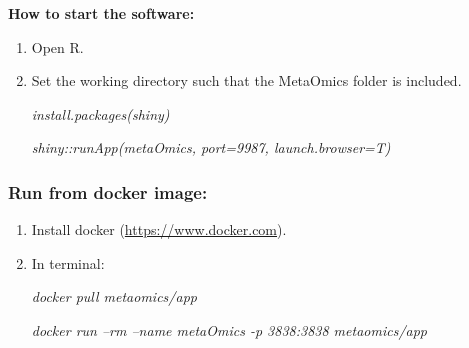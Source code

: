 \noindent\textbf{How to start the software:}

\begin{enumerate}
\item Open R. 
\item Set the working directory such that the MetaOmics folder is included. 

\textit{install.packages(\textquotesingle shiny\textquotesingle)}

\textit{shiny::runApp(\textquotesingle metaOmics\textquotesingle, port=9987, launch.browser=T)}
\end{enumerate}


\subsubsection{Run from docker image:}

\begin{enumerate}
\item Install docker (\url{https://www.docker.com}).
\item In terminal:

\textit{docker pull metaomics/app}

\textit{docker run --rm --name metaOmics -p 3838:3838 metaomics/app}

\end{enumerate}


